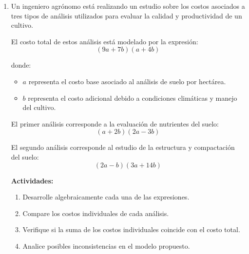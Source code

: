 \documentclass[12pt]{article}
\begin{document}
\begin{enumerate}
		Donde:
		\begin{itemize}
			\item $x$ representa el número base de agricultores por zona.
			\item $y$ representa el factor de variación asociado a condiciones climáticas.
		\end{itemize}
		
		\textbf{Actividades:}
		\begin{enumerate}[label=\alph*)]
			\item Simplifique cada una de las expresiones algebraicas.
			\item Identifique el tipo de operación utilizada en cada caso (productos notables, reducción de términos, etc.).
			\item Determine cuál de las charlas tuvo mayor número de asistentes en términos algebraicos.
			\item Analice si existen inconsistencias o redundancias en las expresiones dadas.
		\end{enumerate}
		
		\newpage
		
		\vspace*{0.5em}
		
		\item Un ingeniero agrónomo está realizando un estudio sobre los costos asociados a tres tipos de análisis utilizados para evaluar la calidad y productividad de un cultivo.
		
		El costo total de estos análisis está modelado por la expresión:
		\[
		(9a + 7b)(a + 4b)
		\]
		
		donde:
		\begin{itemize}
			\item $a$ representa el costo base asociado al análisis de suelo por hectárea.
			\item $b$ representa el costo adicional debido a condiciones climáticas y manejo del cultivo.
		\end{itemize}
		
		El primer análisis corresponde a la evaluación de nutrientes del suelo:
		\[
		(a + 2b)(2a - 3b)
		\]
		
		El segundo análisis corresponde al estudio de la estructura y compactación del suelo:
		\[
		(2a - b)(3a + 14b)
		\]
		
		\textbf{Actividades:}
		\begin{enumerate}[label=\alph*)]
			\item Desarrolle algebraicamente cada una de las expresiones.
			\item Compare los costos individuales de cada análisis.
			\item Verifique si la suma de los costos individuales coincide con el costo total.
			\item Analice posibles inconsistencias en el modelo propuesto.
		\end{enumerate}
		

\end{enumerate}
\end{document}
